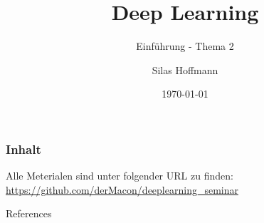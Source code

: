 \documentclass[10pt, handout]{beamer}
\title{Deep Learning}
\subtitle{Einführung - Thema 2}
\date{\today}
\author{Silas Hoffmann}
\institute{Fachhochschule Wedel}
\begin{document}
\maketitle

\begin{frame}
\frametitle{Inhalt}
\tableofcontents
\end{frame}




\maketitle

\appendix




\begin{frame}[standout]


{\normalsize Alle Meterialen sind unter folgender URL zu finden: \\ \url{https://github.com/derMacon/deeplearning_seminar}}
\end{frame}

\begin{frame}[allowframebreaks]{References}
  \nocite{*} 
  
  
\end{frame}
\end{document}

